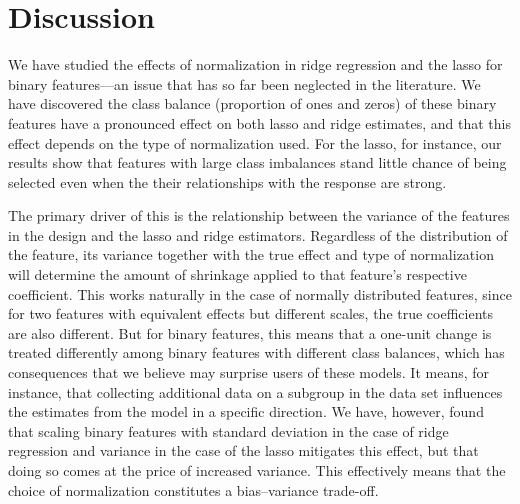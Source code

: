 \section{Discussion}\label{sec:discussion}

We have studied the effects of normalization in ridge regression and the lasso for binary
features---an issue that has so far been neglected in the literature. We have discovered
the class balance (proportion of ones and zeros) of these binary features have a pronounced
effect on both lasso and ridge estimates, and that this effect depends on the type of
normalization used. For the lasso, for instance, our results show that features with large
class imbalances stand little chance of being selected even when the their relationships
with the response are strong.

The primary driver of this is the relationship between the variance of the features in the
design and the lasso and ridge estimators. Regardless of the distribution of the feature,
its variance together with the true effect and type of normalization will determine the
amount of shrinkage applied to that feature's respective coefficient. This works naturally
in the case of normally distributed features, since for two features with equivalent
effects but different scales, the true coefficients are also different. But for binary
features, this means that a one-unit change is treated differently among binary features
with different class balances, which has consequences that we believe may surprise users of
these models. It means, for instance, that collecting additional data on a subgroup in the
data set influences the estimates from the model in a specific direction. We have, however,
found that scaling binary features with standard deviation in the case of ridge regression
and variance in the case of the lasso mitigates this effect, but that doing so comes at the
price of increased variance. This effectively means that the choice of normalization
constitutes a bias--variance trade-off.

